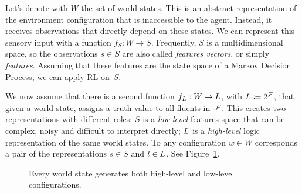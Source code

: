 Let's denote with $W$ the set of world states. This is an abstract
representation of the environment configuration that is inaccessible to the
agent. Instead, it receives observations that directly depend on these states.
We can represent this sensory input with a function $f_S: W \to S$.
Frequently, $S$ is a multidimensional space, so the observations $s \in S$ are
also called \emph{features vectors}, or simply \emph{features}. Assuming that
these features are the state space of a Markov Decision Process, we can apply
RL on~$S$.

We now assume that there is a second function $f_L: W \to
L$, with $L \coloneqq 2^{\mathcal{F}}$, that given a world
state, assigns a truth value to all fluents in~$\mathcal{F}$.  This creates two
representations with different roles: $S$ is a \emph{low-level} features space
that can be complex, noisy and difficult to interpret directly; $L$
is a \emph{high-level} logic representation of the same world states. To any
configuration $w \in W$ corresponds a pair of the representations $s \in S$
and $l \in L$. See Figure~\ref{fig:representations}.

\begin{figure}
	\centering
	\caption{Every world state generates both high-level and low-level
		configurations.}
	\label{fig:representations}
\end{figure}

